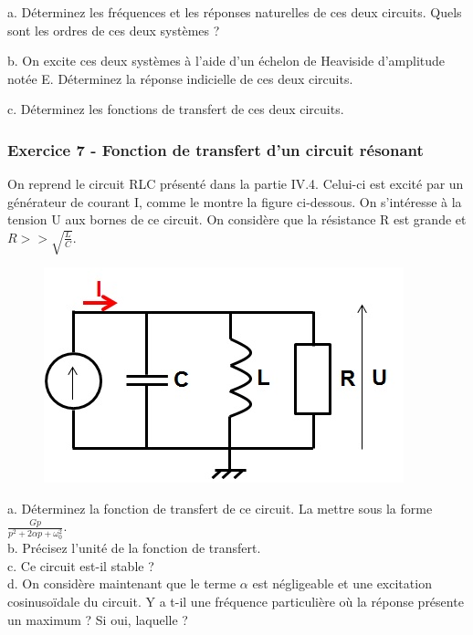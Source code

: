 \documentclass[11pt]{report}
\begin{document}
 	a. Déterminez les fréquences et les réponses naturelles de ces deux circuits. Quels sont les ordres de ces deux systèmes ? 
 	
 	b. On excite ces deux systèmes à l'aide d'un échelon de Heaviside d'amplitude notée E. Déterminez la réponse indicielle de ces deux circuits. 
 	
 	c. Déterminez les fonctions de transfert de ces deux circuits.
 	
 	\vspace{1\baselineskip}
 	
 	\subsubsection{Exercice 7 - Fonction de transfert d'un circuit résonant}
 	
 	On reprend le circuit RLC présenté dans la partie IV.4. Celui-ci est excité par un générateur de courant I, comme le montre la figure ci-dessous. On s'intéresse à la tension U aux bornes de ce circuit. On considère que la résistance R est grande et $R>>\sqrt{\frac{L}{C}}$.
 	 	
 	\begin{figure}[h!]
 		\centering
 		\includegraphics[scale=0.5]{images/Exo_2_5.jpg} 
 	\end{figure} 
 
 	a. Déterminez la fonction de transfert de ce circuit. La mettre sous la forme $\frac{Gp}{p^2+2\alpha p+\omega_{0}^{2}}$.\\
 	
 	b. Précisez l'unité de la fonction de transfert. \\
 	
 	c. Ce circuit est-il stable ?\\
 	
 	d. On considère maintenant que le terme $\alpha$ est négligeable et une excitation cosinusoïdale du circuit. Y a t-il une fréquence particulière où la réponse présente un maximum ? Si oui, laquelle ? \\
 	
\end{document}
